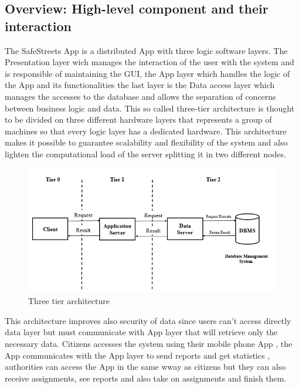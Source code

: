 \subsection{Overview: High-level component and their interaction}
The SafeStreets App is a distributed App with three logic software layers.
The Presentation layer wich manages the interaction of the user with the system and is responsible of maintaining the GUI, 
the App layer which handles the logic of the App and its functionalities the last layer is the Data access layer which manages the accesses to the database and allows the separation of concerns between business logic and data.
This so called three-tier architecture is thought to be divided on three different hardware layers that represents a group of machines so that every logic layer has a dedicated hardware. This architecture makes it possible to guarantee scalability and flexibility of the system and also lighten the computational load of the server splitting it in two different nodes.
\begin{figure}[H]
\centering
\includegraphics[width=\textwidth]{Images/3tier.png}
\caption{\label{fig:ComWI}Three tier architecture}
\end{figure}
This architecture improves also security of data since users can't access directly data layer but must communicate with App layer that will retrieve only the necessary data.
Citizens accesses the system using their mobile phone App , the App communicates with the App layer to send reports and get statistics , authorities can access the App in the same wway as citizens but they can also receive assignments, see reports and also take on assignments and finish them.
